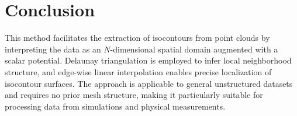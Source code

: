 \section{Conclusion}
This method facilitates the extraction of isocontours from point clouds by interpreting the data as an \(N\)-dimensional spatial domain augmented with a scalar potential. Delaunay triangulation is employed to infer local neighborhood structure, and edge-wise linear interpolation enables precise localization of isocontour surfaces. The approach is applicable to general unstructured datasets and requires no prior mesh structure, making it particularly suitable for processing data from simulations and physical measurements.
